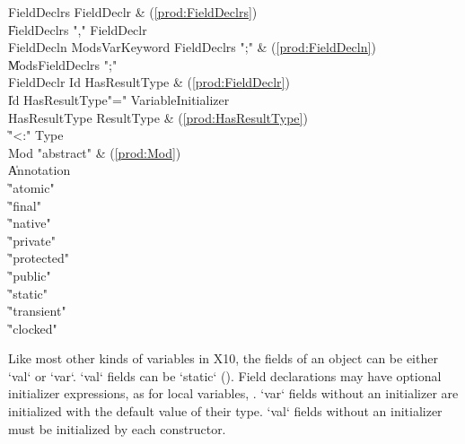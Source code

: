 \begin{bbgrammar}
         FieldDeclrs \: FieldDeclr & (\ref{prod:FieldDeclrs}) \\
                     \| FieldDeclrs \xcd"," FieldDeclr \\
          FieldDecln \: Mods\opt VarKeyword FieldDeclrs \xcd";" & (\ref{prod:FieldDecln}) \\
                     \| Mods\opt FieldDeclrs \xcd";" \\
          FieldDeclr \: Id HasResultType & (\ref{prod:FieldDeclr}) \\
                     \| Id HasResultType\opt \xcd"=" VariableInitializer \\
       HasResultType \: ResultType & (\ref{prod:HasResultType}) \\
                     \| \xcd"<:" Type \\
                 Mod \: \xcd"abstract" & (\ref{prod:Mod}) \\
                     \| Annotation \\
                     \| \xcd"atomic" \\
                     \| \xcd"final" \\
                     \| \xcd"native" \\
                     \| \xcd"private" \\
                     \| \xcd"protected" \\
                     \| \xcd"public" \\
                     \| \xcd"static" \\
                     \| \xcd"transient" \\
                     \| \xcd"clocked" \\
\end{bbgrammar}

Like most other kinds of variables in X10, 
the fields of an object can be either \xcd`val` or \xcd`var`. 
\xcd`val` fields can be \xcd`static` ().
Field declarations may have optional
initializer expressions, as for local variables, .
\xcd`var` fields without an initializer are initialized with the default value
of their type. \xcd`val` fields without an initializer must be initialized by
each constructor.


